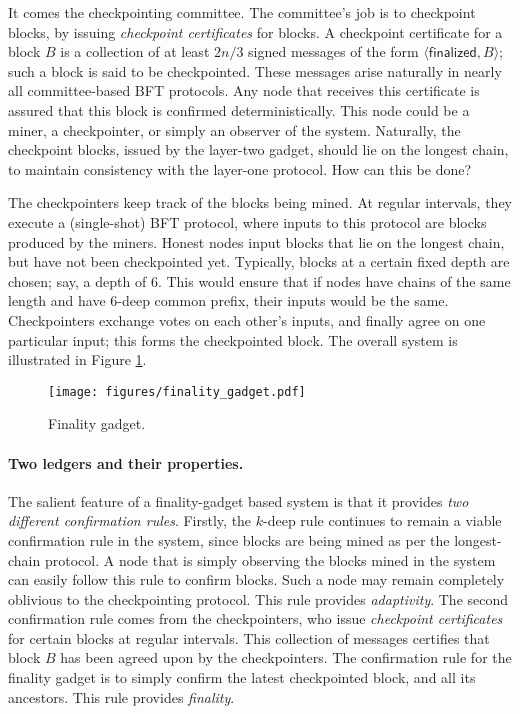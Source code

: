 \documentclass{article}
\begin{document}
It comes the checkpointing committee. The committee's job is to checkpoint blocks, by issuing \textit{checkpoint certificates} for blocks. A checkpoint certificate for a block $B$ is a collection of at least $2n/3$ signed messages of the form $\langle \mathsf{finalized}, B \rangle$; such a block is said to be checkpointed. These messages arise naturally in nearly all committee-based BFT protocols. Any node that receives this certificate is assured that this block is confirmed deterministically. This node could be a miner, a checkpointer, or simply an observer of the system. Naturally, the checkpoint blocks, issued by the layer-two gadget, should lie on the longest chain, to maintain consistency with the layer-one protocol. How can this be done?  

The checkpointers keep track of the blocks being mined. At regular intervals, they execute a (single-shot) BFT protocol, where inputs to this protocol are blocks produced by the miners. Honest nodes input blocks that lie on the longest chain, but have not been checkpointed yet. Typically, blocks at a certain fixed depth are chosen; say, a depth of $6$. This would ensure that if nodes have chains of the same length and have $6$-deep common prefix, their inputs would be the same. Checkpointers exchange votes on each other's inputs, and finally agree on one particular input; this forms the checkpointed block. The overall system is illustrated in Figure \ref{fig:finality-gadget}.

\begin{figure}
    \centering
    \texttt{[image: figures/finality\_gadget.pdf]}
    \caption{Finality gadget.}
    \label{fig:finality-gadget}
\end{figure}

\paragraph{Two ledgers and their properties.} The salient feature of a finality-gadget based system is that it provides \textit{two different confirmation rules}. Firstly, the $k$-deep rule continues to remain a viable confirmation rule in the system, since blocks are being mined as per the longest-chain protocol. A node that is simply observing the blocks mined in the system can easily follow this rule to confirm blocks. Such a node may remain completely oblivious to the checkpointing protocol. This rule provides \textit{adaptivity}. The second confirmation rule comes from the checkpointers, who issue \textit{checkpoint certificates} for certain blocks at regular intervals. This collection of messages certifies that block $B$ has been agreed upon by the checkpointers. The confirmation rule for the finality gadget is to simply confirm the latest checkpointed block, and all its ancestors. This rule provides \textit{finality}.
\end{document}
